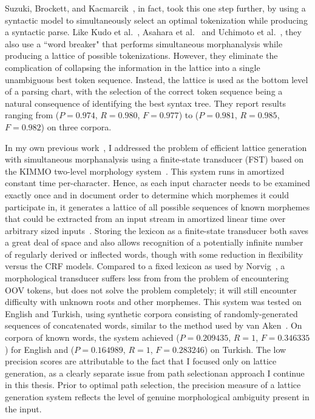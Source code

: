 Suzuki, Brockett, and Kacmarcik~\cite{suzuki00}, in fact, took this one step further, by using a syntactic model to simultaneously select an optimal tokenization while producing a syntactic parse. Like Kudo et al.~\cite{kudo04}, Asahara et al.~\cite{asahara00} and Uchimoto et al.~\cite{uchimoto01}, they also use a ``word breaker" that performs simultaneous morphanalysis while producing a lattice of possible tokenizations. However, they eliminate the complication of collapsing the information in the lattice into a single unambiguous best token sequence. Instead, the lattice is used as the bottom level of a parsing chart, with the selection of the correct token sequence being a natural consequence of identifying the best syntax tree. They report results ranging from ($P = 0.974$, $R = 0.980$, $F = 0.977$) to ($P = 0.981$, $R = 0.985$, $F = 0.982$) on three corpora.



In my own previous work~\cite{kearsley13}, I addressed the problem of efficient lattice generation with simultaneous morphanalysis using a finite-state transducer (FST) based on the KIMMO two-level morphology system~\cite{koskenniemi84}. This system runs in amortized constant time per-character. Hence, as each input character needs to be examined exactly once and in document order to determine which morphemes it could participate in, it generates a lattice of all possible sequences of known morphemes that could be extracted from an input stream in amortized linear time over arbitrary sized inputs~\cite{kearsley13}. Storing the lexicon as a finite-state transducer both saves a great deal of space and also allows recognition of a potentially infinite number of regularly derived or inflected words, though with some reduction in flexibility versus the CRF models. Compared to a fixed lexicon as used by Norvig~\cite{norvig14}, a morphological transducer suffers less from from the problem of encountering OOV tokens, but does not solve the problem completely; it will still encounter difficulty with unknown roots and other morphemes. This system was tested on English and Turkish, using synthetic corpora consisting of randomly-generated sequences of concatenated words, similar to the method used by van Aken~\cite{aken11}. On corpora of known words, the system achieved ($P = 0.209435$, $R = 1$, $F = 0.346335$) for English and ($P = 0.164989$, $R = 1$, $F = 0.283246$) on Turkish.  The low precision scores are attributable to the fact that I focused only on lattice generation, as a clearly separate issue from path selection\textemdash an approach I continue in this thesis. Prior to optimal path selection, the precision measure of a lattice generation system reflects the level of genuine morphological ambiguity present in the input.

